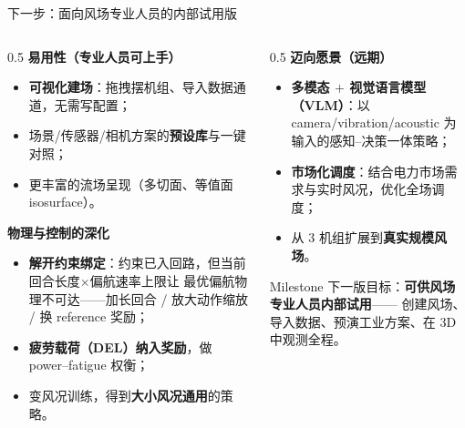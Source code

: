 \documentclass[aspectratio=169,10pt,UTF8]{ctexbeamer}
\newcommand{\hl}[1]{{\color{myblue}\bfseries #1}}
\newcommand{\hlg}[1]{{\color{mygreen}\bfseries #1}}
\begin{document}
\begin{frame}{下一步：面向风场专业人员的内部试用版}
  \begin{columns}[T]
    \begin{column}{0.5\textwidth}
      \textbf{易用性（专业人员可上手）}
      \begin{itemize}\small
        \item \hl{可视化建场}：拖拽摆机组、导入数据通道，无需写配置；
        \item 场景/传感器/相机方案的\textbf{预设库}与一键对照；
        \item 更丰富的流场呈现（多切面、等值面 isosurface）。
      \end{itemize}
      \vspace{0.3em}
      \textbf{物理与控制的深化}
      \begin{itemize}\small
        \item \hl{解开约束绑定}：约束已入回路，但当前回合长度$\times$偏航速率上限让
              最优偏航物理不可达——加长回合 / 放大动作缩放 / 换 reference 奖励；
        \item \hl{疲劳载荷（DEL）纳入奖励}，做 power–fatigue 权衡；
        \item 变风况训练，得到\textbf{大小风况通用}的策略。
      \end{itemize}
    \end{column}
    \begin{column}{0.5\textwidth}
      \textbf{迈向愿景（远期）}
      \begin{itemize}\small
        \item \hl{多模态 $+$ 视觉语言模型（VLM）}：以 camera/vibration/acoustic
              为输入的感知–决策一体策略；
        \item \hl{市场化调度}：结合电力市场需求与实时风况，优化全场调度；
        \item 从 3 机组扩展到\textbf{真实规模风场}。
      \end{itemize}
      \vspace{0.3em}
      \begin{block}{Milestone}
        \small 下一版目标：\hlg{可供风场专业人员内部试用}——
        创建风场、导入数据、预演工业方案、在 3D 中观测全程。
      \end{block}
    \end{column}
  \end{columns}
\end{frame}
\end{document}
